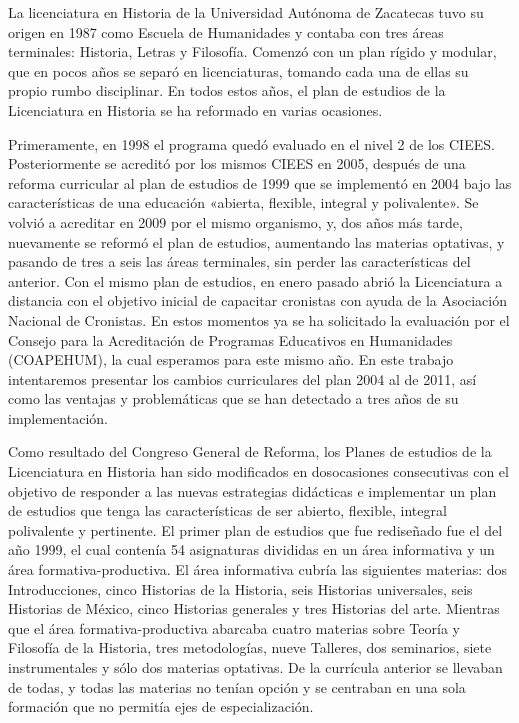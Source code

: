 \bigskip 
La licenciatura en Historia de la Universidad Autónoma de 
Zacatecas tuvo su origen en 1987 como Escuela de Humanidades y contaba con tres 
áreas terminales: Historia, Letras y Filosofía. Comenzó con un plan 
rígido y modular, que en pocos años se separó en licenciaturas, tomando 
cada una de ellas su propio rumbo disciplinar. En todos estos años, el plan de 
estudios de la Licenciatura en Historia se ha reformado en varias 
ocasiones.
\enlargethispage{1\baselineskip}

Primeramente, en 1998 el programa quedó evaluado en el nivel 2 de los 
CIEES. Posteriormente se acreditó por los mismos CIEES en 2005, después 
de una reforma curricular al plan de estudios de 1999 que se implementó 
en 2004 bajo las características de una educación «abierta, flexible, 
integral y polivalente». Se volvió a acreditar en 2009 por el mismo organismo, 
y, dos años más tarde, nuevamente se reformó el plan de estudios, 
aumentando las materias optativas, y pasando de tres a seis las áreas 
terminales, sin perder las características del anterior. Con el mismo 
plan de estudios, en enero pasado abrió la Licenciatura a distancia con 
el objetivo inicial de capacitar cronistas con ayuda de la Asociación 
Nacional de Cronistas. En estos momentos ya se ha solicitado la evaluación 
por el Consejo para la Acreditación de Programas Educativos en 
Humanidades (COAPEHUM), la cual esperamos para este mismo año. En este 
trabajo intentaremos presentar los cambios curriculares del plan 2004 al 
de 2011, así como las ventajas y problemáticas que se han detectado a 
tres años de su implementación. 


Como resultado del Congreso General de Reforma, los Planes de estudios 
de la Licenciatura en Historia han sido modificados en dos\linebreak ocasiones 
consecutivas con el objetivo de responder a las nuevas estrategias didácticas
e implementar un plan de estudios que tenga las características de ser abierto, flexible, 
integral polivalente y pertinente. El primer plan de estudios que fue 
rediseñado fue el del año 1999, el cual contenía 54 asignaturas divididas 
en un área informativa y un área formativa-productiva. El área informativa 
cubría las siguientes materias: dos Introducciones, 
cinco Historias de la Historia, seis Historias universales, seis 
Historias de México, cinco Historias generales y tres Historias del 
arte. Mientras que el área formativa-productiva abarcaba cuatro materias 
sobre Teoría y Filosofía de la Historia, tres metodologías, nueve Talleres, dos 
seminarios, siete instrumentales y sólo dos materias optativas. De la 
currícula anterior se llevaban de todas, y todas las materias no tenían opción 
y se centraban en una sola formación que no permitía ejes de especialización. 

